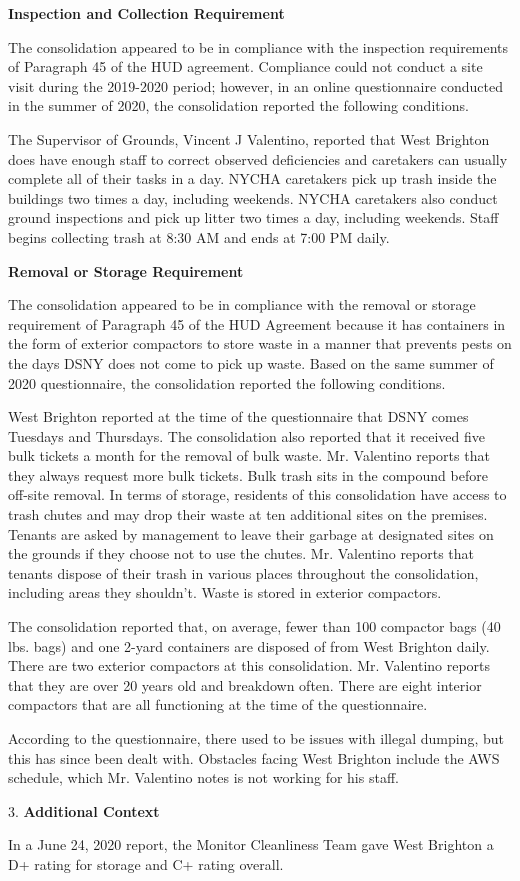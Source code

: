 
\textbf{Inspection and Collection Requirement}

The consolidation appeared to be in compliance with the inspection requirements of Paragraph 45 of the HUD agreement. Compliance could not conduct a site visit during the 2019-2020 period; however, in an online questionnaire conducted in the summer of 2020, the consolidation reported the following conditions.

The Supervisor of Grounds, Vincent J Valentino, reported that West Brighton does have enough staff to correct observed deficiencies and caretakers can usually complete all of their tasks in a day. NYCHA caretakers pick up trash inside the buildings two times a day, including weekends. NYCHA caretakers also conduct ground inspections and pick up litter two times a day, including weekends. Staff begins collecting trash at 8:30 AM and ends at 7:00 PM daily. 

\textbf{Removal or Storage Requirement}

The consolidation appeared to be in compliance with the removal or storage requirement of Paragraph  45 of the HUD Agreement because it has containers in the form of exterior compactors to store waste in a manner that prevents pests on the days DSNY does not come to pick up waste. Based on the same summer of  2020 questionnaire, the consolidation reported the following conditions.

West Brighton reported at the time of the questionnaire that DSNY comes Tuesdays and Thursdays. The consolidation also reported that it received five bulk tickets a month for the removal of bulk waste. Mr. Valentino reports that they always request more bulk tickets. Bulk trash sits in the compound before off-site removal. In terms of storage, residents of this consolidation have access to trash chutes and may drop their waste at ten additional sites on the premises.  Tenants are asked by management to leave their garbage at designated sites on the grounds if they choose not to use the chutes. Mr. Valentino reports that tenants dispose of their trash in various places throughout the consolidation, including areas they shouldn't. Waste is stored in exterior compactors. 

The consolidation reported that, on average, fewer than 100 compactor bags (40 lbs. bags) and one 2-yard containers are disposed of from West Brighton daily. There are two exterior compactors at this consolidation. Mr. Valentino reports that they are over 20 years old and breakdown often. There are eight interior compactors that are all functioning at the time of the questionnaire.

 

According to the  questionnaire, there used to be issues with illegal dumping, but this has since been dealt with. Obstacles facing West Brighton include the AWS schedule, which Mr. Valentino notes is not working for his staff.

3. \textbf{Additional Context} 

In a June 24, 2020 report, the Monitor Cleanliness Team gave West Brighton a D+ rating for storage and C+ rating overall.  